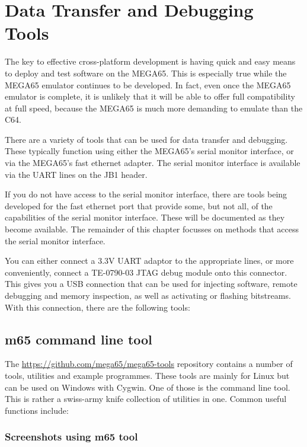 \chapter{Data Transfer and Debugging Tools}
\label{cha:transfer-and-debug-tools}

The key to effective cross-platform development is having quick and
easy means to deploy and test software on the MEGA65.  This is
especially true while the MEGA65 emulator continues to be developed.
In fact, even once the MEGA65 emulator is complete, it is unlikely
that it will be able to offer full compatibility at full speed,
because the MEGA65 is much more demanding to emulate than the C64.

There are a variety of tools that can be used for data transfer and
debugging.  These typically function using either the MEGA65's serial
monitor interface, or via the MEGA65's fast ethernet adapter.  The
serial monitor interface is available via the UART lines on the JB1
header.

If you do not have access to the serial monitor interface, there are
tools being developed for the fast ethernet port that provide some,
but not all, of the capabilities of the serial monitor
interface. These will be documented as they become available. The
remainder of this chapter focusses on methods that access the serial
monitor interface.

You can either connect a 3.3V UART adaptor to the appropriate
lines, or more conveniently, connect a TE-0790-03 JTAG debug module
onto this connector.  This gives you a USB connection that can be used
for injecting software, remote debugging and memory inspection, as
well as activating or flashing bitstreams.  With this connection,
there are the following tools:

\section{m65 command line tool}

The \url{https://github.com/mega65/mega65-tools} repository contains a
number of tools, utilities and example programmes. These tools are mainly for Linux but can be used on Windows with Cygwin. One of those is
the  command line tool. This is rather a swiss-army
knife collection of utilities in one.  Common useful functions
include:

\subsection{Screenshots using m65 tool}

